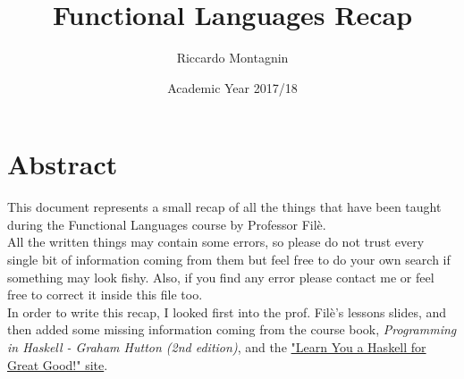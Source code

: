 \documentclass[11pt,a4paper,oneside]{book}
\begin{document}
\raggedright


\title{Functional Languages Recap}
\author{Riccardo Montagnin}
\date{Academic Year 2017/18}
\maketitle

\newpage

\chapter*{Abstract}
This document represents a small recap of all the things that have been taught during the Functional Languages course by Professor Filè. \\
All the written things may contain some errors, so please do not trust every single bit of information coming from them but feel free to do your own search if something may look fishy. Also, if you find any error please contact me or feel free to correct it inside this file too. \\
In order to write this recap, I looked first into the prof. Filè's lessons slides, and then added some missing information coming from the course book, \textit{Programming in Haskell - Graham Hutton (2nd edition)}, and the \href{http://learnyouahaskell.com/}{"Learn You a Haskell for Great Good!" site}.

\tableofcontents












	
\end{document}
